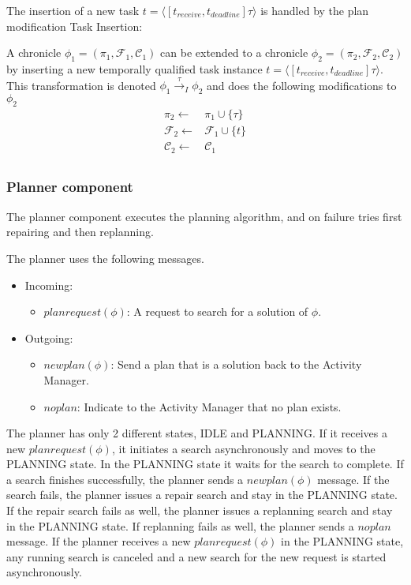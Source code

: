 The insertion of a new task $t = \langle[t_{receive},t_{deadline}] \tau\rangle$ is handled by the plan modification Task Insertion:

\begin{definition}
    A chronicle $\phi_1 = (\pi_1,\mathcal{F}_1,\mathcal{C}_1)$ can be extended to a chronicle $\phi_2 = (\pi_2,\mathcal{F}_2,\mathcal{C}_2)$ by inserting a new temporally qualified task instance $t = \langle[t_{receive},t_{deadline}] \tau\rangle$. This transformation is denoted $\phi_1 \xrightarrow{\tau}_I \phi_2$ and does the following modifications to $\phi_2$
  \begin{align*}
    \pi_2 \leftarrow & \pi_1 \cup \{\tau\} \\
    \mathcal{F}_2 \leftarrow & \mathcal{F}_1 \cup \{t\} \\
    \mathcal{C}_2 \leftarrow & \mathcal{C}_1 \\
  \end{align*}
\end{definition}

\subsubsection{Planner component}

The planner component executes the planning algorithm, and on failure tries first repairing and then replanning.


The planner uses the following messages.

\begin{itemize}
    \item Incoming:
    \begin{itemize}
        \item $planrequest(\phi)$: A request to search for a solution of $\phi$.
    \end{itemize}
    \item Outgoing:
    \begin{itemize}
        \item $newplan(\phi)$: Send a plan that is a solution back to the Activity Manager.
        \item $noplan$: Indicate to the Activity Manager that no plan exists.
    \end{itemize}
\end{itemize}

The planner has only 2 different states, IDLE and PLANNING.
If it receives a new $planrequest(\phi)$, it initiates a search asynchronously and moves to the PLANNING state.
In the PLANNING state it waits for the search to complete.
If a search finishes successfully, the planner sends a $newplan(\phi)$ message.
If the search fails, the planner issues a repair search and stay in the PLANNING state.
If the repair search fails as well, the planner issues a replanning search and stay in the PLANNING state.
If replanning fails as well, the planner sends a $noplan$ message.
If the planner receives a new $planrequest(\phi)$ in the PLANNING state, any running search is canceled and a new search for the new request is started asynchronously.

